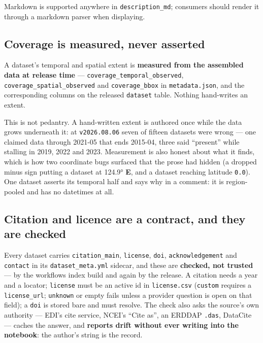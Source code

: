 \documentclass[
  letterpaper,
  DIV=11,
  numbers=noendperiod]{scrreprt}
\begin{document}
Markdown is supported anywhere in \texttt{description\_md}; consumers
should render it through a markdown parser when displaying.

\subsection{Coverage is measured, never
asserted}\label{coverage-is-measured-never-asserted}

A dataset's temporal and spatial extent is \textbf{measured from the
assembled data at release time} ---
\texttt{coverage\_temporal\_observed},
\texttt{coverage\_spatial\_observed} and \texttt{coverage\_bbox} in
\texttt{metadata.json}, and the corresponding columns on the released
\texttt{dataset} table. Nothing hand-writes an extent.

This is not pedantry. A hand-written extent is authored once while the
data grows underneath it: at \texttt{v2026.08.06} seven of fifteen
datasets were wrong --- one claimed data through 2021-05 that ends
2015-04, three said ``present'' while stalling in 2019, 2022 and 2023.
Measurement is also honest about what it finds, which is how two
coordinate bugs surfaced that the prose had hidden (a dropped minus sign
putting a dataset at 124.9° \textbf{E}, and a dataset reaching latitude
\texttt{0.0}). One dataset asserts its temporal half and says why in a
comment: it is region-pooled and has no datetimes at all.

\subsection{Citation and licence are a contract, and they are
checked}\label{citation-and-licence-are-a-contract-and-they-are-checked}

Every dataset carries \texttt{citation\_main}, \texttt{license},
\texttt{doi}, \texttt{acknowledgement} and \texttt{contact} in its
\texttt{dataset\_meta.yml} sidecar, and these are \textbf{checked, not
trusted} --- by the workflows index build and again by the release. A
citation needs a year and a locator; \texttt{license} must be an active
id in \texttt{license.csv} (\texttt{custom} requires a
\texttt{license\_url}; \texttt{unknown} or empty fails unless a provider
question is open on that field); a \texttt{doi} is stored bare and must
resolve. The check also asks the source's own authority --- EDI's cite
service, NCEI's ``Cite as'', an ERDDAP \texttt{.das}, DataCite ---
caches the answer, and \textbf{reports drift without ever writing into
the notebook}: the author's string is the record.
\end{document}
